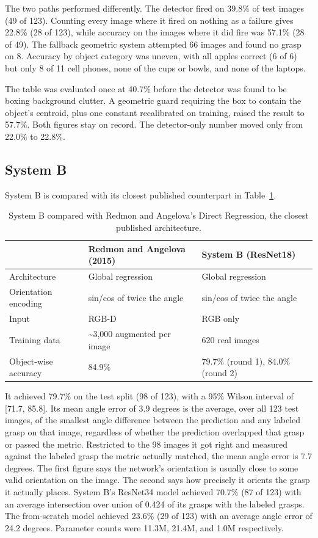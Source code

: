 \documentclass[12pt,letterpaper]{article}
\begin{document}
The two paths performed differently. The detector fired on 39.8\% of
test images (49 of 123). Counting every image where it fired on nothing
as a failure gives 22.8\% (28 of 123), while accuracy on the images
where it did fire was 57.1\% (28 of 49). The fallback geometric system
attempted 66 images and found no grasp on 8. Accuracy by object
category was uneven, with all apples correct (6 of 6) but only 8 of 11
cell phones, none of the cups or bowls, and none of the laptops.

The table was evaluated once at 40.7\% before the detector was found to
be boxing background clutter. A geometric guard requiring the box to
contain the object's centroid, plus one constant recalibrated on
training, raised the result to 57.7\%. Both figures stay on record. The
detector-only number moved only from 22.0\% to 22.8\%.

\subsection{System B}

System B is compared with its closest published counterpart in
Table~\ref{tab:redmon}.

\begin{table}[H]
\centering
\caption{System B compared with Redmon and Angelova's Direct
Regression, the closest published architecture.}
\label{tab:redmon}
\begin{tabular}{lll}
\toprule
 & Redmon and Angelova (2015) & System B (ResNet18) \\
\midrule
Architecture         & Global regression & Global regression \\
Orientation encoding & sin/cos of twice the angle
                     & sin/cos of twice the angle \\
Input                & RGB-D & RGB only \\
Training data        & \textasciitilde{}3,000 augmented per image
                     & 620 real images \\
Object-wise accuracy & 84.9\% & 79.7\% (round 1), 84.0\% (round 2) \\
\bottomrule
\end{tabular}
\end{table}

It achieved 79.7\% on the test split (98 of 123), with a 95\% Wilson
interval of [71.7, 85.8]. Its mean angle error of 3.9 degrees is
the average, over all 123 test images, of the smallest angle difference
between the prediction and any labeled grasp on that image, regardless
of whether the prediction overlapped that grasp or passed the metric.
Restricted to the 98 images it got right and measured against the
labeled grasp the metric actually matched, the mean angle error is 7.7
degrees. The first figure says the network's orientation is usually
close to some valid orientation on the image. The second says how
precisely it orients the grasp it actually places. System B's ResNet34 model achieved 70.7\% (87 of 123) with an
average intersection over union of 0.424 of its grasps with the labeled
grasps. The from-scratch model achieved 23.6\% (29 of 123) with an
average angle error of 24.2 degrees. Parameter counts were 11.3M,
21.4M, and 1.0M respectively.
\end{document}
